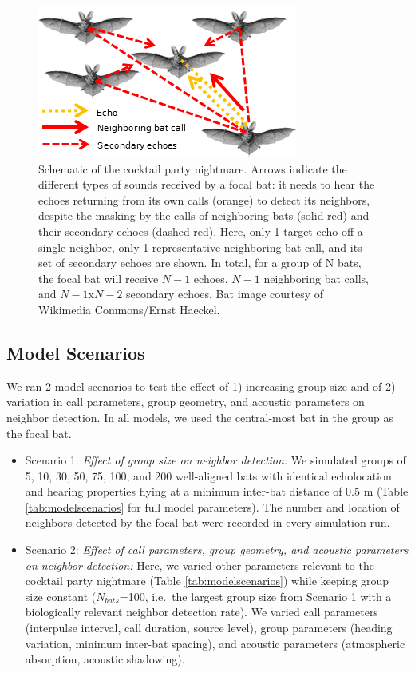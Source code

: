 \documentclass[
]{book}
\providecommand{\tightlist}{%
  \setlength{\itemsep}{0pt}\setlength{\parskip}{0pt}}
\begin{document}
\begin{figure}[!htbp]
\includegraphics[]{original_papers/CPN_figures/Figure_1/cpn_sounds_schematic_012.png}
\centering
\caption{Schematic of the cocktail party nightmare. Arrows indicate the different types of sounds received by a focal bat: it needs to hear the echoes returning from its own calls (orange) to detect its neighbors, despite the masking by the calls of neighboring bats (solid red) and their secondary echoes (dashed red). Here, only 1 target echo off a single neighbor, only 1 representative neighboring bat call, and its set of secondary echoes are shown. In total, for a group of N bats, the focal bat will receive $N-1$ echoes, $N-1$ neighboring bat calls, and $N-1$x$N-2$ secondary echoes. Bat image courtesy of Wikimedia Commons/Ernst Haeckel.}
\label{cpn_fig1}
\end{figure}

\hypertarget{model-scenarios}{%
\subsection{Model Scenarios}\label{model-scenarios}}

We ran 2 model scenarios to test the effect of 1) increasing group size and of 2) variation in call parameters, group geometry, and acoustic parameters on neighbor detection. In all models, we used the central-most bat in the group as the focal bat.

\begin{itemize}
\tightlist
\item
  Scenario 1: \emph{Effect of group size on neighbor detection:} We simulated groups of 5, 10, 30, 50, 75, 100, and 200 well-aligned bats with identical echolocation and hearing properties flying at a minimum inter-bat distance of 0.5 m (Table \ref{tab:modelscenarios} for full model parameters). The number and location of neighbors detected by the focal bat were recorded in every simulation run.
\item
  Scenario 2: \emph{Effect of call parameters, group geometry, and acoustic parameters on neighbor detection:} Here, we varied other parameters relevant to the cocktail party nightmare (Table \ref{tab:modelscenarios}) while keeping group size constant (\(N_{bats}\)=100, i.e.~the largest group size from Scenario 1 with a biologically relevant neighbor detection rate). We varied call parameters (interpulse interval, call duration, source level), group parameters (heading variation, minimum inter-bat spacing), and acoustic parameters (atmospheric absorption, acoustic shadowing).
\end{itemize}
\end{document}

